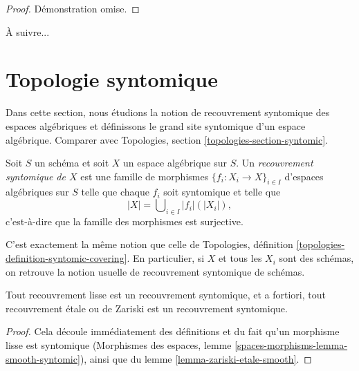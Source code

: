 \begin{proof}
Démonstration omise.
\end{proof}

\noindent
À suivre...









\section{Topologie syntomique}
\label{section-syntomic}

\noindent
Dans cette section, nous étudions la notion de recouvrement syntomique des
espaces algébriques et définissons le grand site syntomique d'un
espace algébrique. Comparer avec
Topologies, section \ref{topologies-section-syntomic}.

\begin{definition}
\label{definition-syntomic-covering}
Soit $S$ un schéma et soit $X$ un espace algébrique sur $S$.
Un {\it recouvrement syntomique de $X$} est une famille de morphismes
$\{f_i : X_i \to X\}_{i \in I}$ d'espaces algébriques sur $S$
telle que chaque $f_i$ soit syntomique
et telle que
$$
|X| = \bigcup\nolimits_{i \in I} |f_i|(|X_i|),
$$
c'est-à-dire que la famille des morphismes est surjective.
\end{definition}

\noindent
C'est exactement la même notion que celle de
Topologies, définition \ref{topologies-definition-syntomic-covering}.
En particulier, si $X$ et tous les $X_i$ sont des schémas, on retrouve la
notion usuelle de recouvrement syntomique de schémas.

\begin{lemma}
\label{lemma-zariski-etale-smooth-syntomic}
Tout recouvrement lisse est un recouvrement syntomique, et a fortiori,
tout recouvrement \'etale ou de Zariski est un recouvrement syntomique.
\end{lemma}

\begin{proof}
Cela découle immédiatement des définitions et du fait qu'un morphisme lisse
est syntomique
(Morphismes des espaces, lemme \ref{spaces-morphisms-lemma-smooth-syntomic}),
ainsi que du lemme \ref{lemma-zariski-etale-smooth}.
\end{proof}

